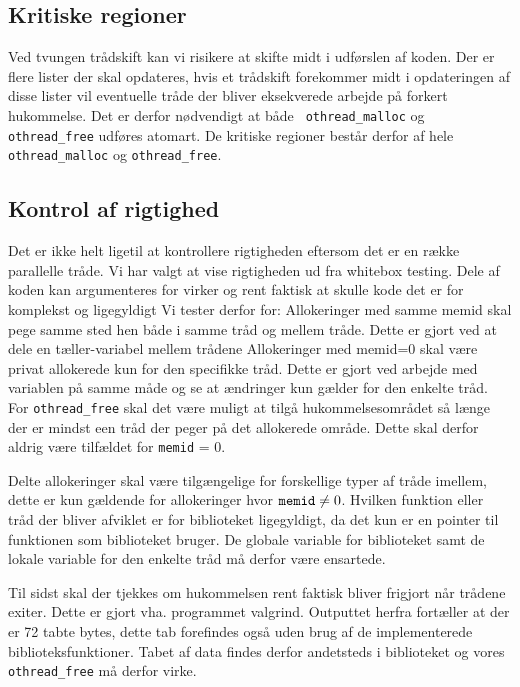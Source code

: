 \documentclass[titlepage]{article}
\begin{document}
\subsection{Kritiske regioner}
Ved tvungen trådskift kan vi risikere at skifte midt i udførslen af koden. Der er flere lister der
skal opdateres, hvis et trådskift forekommer midt i opdateringen af disse lister vil eventuelle
tråde der bliver eksekverede arbejde på forkert hukommelse. Det er derfor nødvendigt at både {\tt
othread\_malloc} og {\tt othread\_free} udføres atomart. De kritiske regioner består derfor af hele
{\tt othread\_malloc} og {\tt othread\_free}.

\subsection{Kontrol af rigtighed}
Det er ikke helt ligetil at kontrollere rigtigheden eftersom det er en række parallelle tråde. Vi har
valgt at vise rigtigheden ud fra whitebox testing. Dele af koden kan argumenteres for virker og rent
faktisk at skulle kode det er for komplekst og ligegyldigt Vi tester derfor for:
Allokeringer med samme memid skal pege samme sted hen både i samme tråd og mellem tråde. Dette er
gjort ved at dele en tæller-variabel mellem trådene
Allokeringer med memid=0 skal være privat allokerede kun for den specifikke tråd. Dette er gjort ved
arbejde med variablen på samme måde og se at ændringer kun gælder for den enkelte tråd.
For {\tt othread\_free} skal det være muligt at tilgå hukommelsesområdet så længe der er mindst een
tråd der peger på det allokerede område. Dette skal derfor aldrig være tilfældet for {\tt memid} =
0. 

Delte allokeringer skal være tilgængelige for forskellige typer af tråde imellem, dette er kun
gældende for allokeringer hvor ${\tt memid} \neq 0$. Hvilken funktion eller tråd der bliver afviklet
er for biblioteket ligegyldigt, da det kun er en pointer til funktionen som biblioteket bruger. De
globale variable for biblioteket samt de lokale variable for den enkelte tråd må derfor være
ensartede.

Til sidst skal der tjekkes om hukommelsen rent faktisk bliver frigjort når trådene exiter. Dette er
gjort vha. programmet valgrind. Outputtet herfra fortæller at der er 72 tabte bytes, dette tab
forefindes også uden brug af de implementerede biblioteksfunktioner. Tabet af data findes derfor
andetsteds i biblioteket og vores {\tt othread\_free} må derfor virke.
\end{document}
